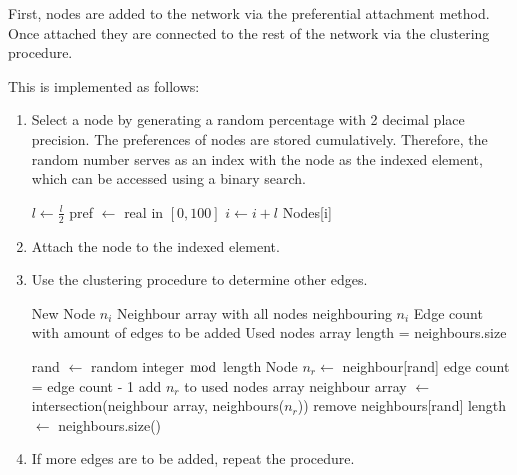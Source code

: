\documentclass[a4paper,11pt,titlepage]{article}
\begin{document}
First, nodes are added to the network via the preferential attachment
method. Once attached they are connected to the rest of the
network via the clustering procedure.

This is implemented as follows:

\begin{enumerate}
  \item
    Select a node by generating a random percentage with 2 decimal place
    precision. The preferences of nodes are stored cumulatively. Therefore, the
    random number serves as an index with the node as the indexed element, which
    can be accessed using a binary search.

    \begin{algorithmic}
          \STATE $l \gets \frac{l}{2}$
            \STATE pref $\gets$ real in  $[0, 100]$
              \STATE $i \gets i+l$
            \ENDIF
          \ENDIF
        \ENDWHILE
      \ENDFOR
      \RETURN Nodes[i]
    \end{algorithmic}

  \item
    Attach the node to the indexed element.

   \item
    Use the clustering procedure to determine other edges.

    \begin{algorithmic}
      \REQUIRE New Node $n_i$
      \REQUIRE Neighbour array with all nodes neighbouring $n_i$
      \REQUIRE Edge count with amount of edges to be added
      \REQUIRE Used nodes array
      \STATE length = neighbours.size

        \STATE rand $\gets$ random integer $\bmod$ length
        \STATE Node $n_r \gets$ neighbour[rand]
          \STATE edge count = edge count - 1
        \STATE add $n_r$ to used nodes array
          \STATE neighbour array $\gets$ intersection(neighbour array, neighbours($n_r$))
        \ELSE
          \STATE remove neighbours[rand]
        \ENDIF
        \STATE length $\gets$ neighbours.size()
      \ENDWHILE
    \end{algorithmic}

   \item If more edges are to be added, repeat the procedure.
\end{enumerate}
\end{document}
